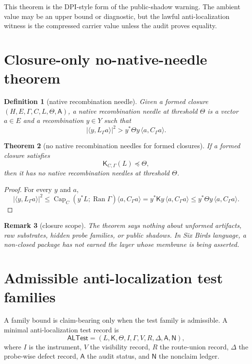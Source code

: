 \documentclass[11pt]{article}
\newtheorem{theorem}{Theorem}[section]
\newtheorem{definition}[theorem]{Definition}
\newtheorem{remark}[theorem]{Remark}
\newcommand{\Capa}{\operatorname{Cap}}
\newcommand{\Ran}{\operatorname{Ran}}
\newcommand{\Kmat}{\mathsf K}
\begin{document}
This theorem is the DPI-style form of the public-shadow warning.  The ambient value may be an upper bound or diagnostic, but the lawful anti-localization witness is the compressed carrier value unless the audit proves equality.

\section{Closure-only no-native-needle theorem}

\begin{definition}[native recombination needle]
Given a formed closure $(H,E,\Gamma,C,L,\Theta,\mathsf A)$, a native recombination needle at threshold $\Theta$ is a vector $a\in E$ and a recombination $y\in Y$ such that
\[
|\langle y,L_\Gamma a\rangle|^2> y^*\Theta y\,\langle a,C_\Gamma a\rangle.
\]
\end{definition}

\begin{theorem}[no native recombination needles for formed closures]
If a formed closure satisfies
\[
\Kmat_{C,\Gamma}(L)\preceq\Theta,
\]
then it has no native recombination needles at threshold $\Theta$.
\end{theorem}

\begin{proof}
For every $y$ and $a$,
\[
|\langle y,L_\Gamma a\rangle|^2
\le \Capa_C(y^*L;\Ran\Gamma)\langle a,C_\Gamma a\rangle
=y^*\Kmat y\,\langle a,C_\Gamma a\rangle
\le y^*\Theta y\,\langle a,C_\Gamma a\rangle.
\]
\end{proof}

\begin{remark}[closure scope]
The theorem says nothing about unformed artifacts, raw substrates, hidden probe families, or public shadows.  In Six Birds language, a non-closed package has not earned the layer whose membrane is being asserted.
\end{remark}

\section{Admissible anti-localization test families}

A family bound is claim-bearing only when the test family is admissible.  A minimal anti-localization test record is
\[
\mathsf{ALTest}=(L,\Kmat,\Theta,I,\Gamma,V,R,\Delta,\mathsf A,\mathsf N),
\]
where $I$ is the instrument, $V$ the visibility record, $R$ the route-union record, $\Delta$ the probe-wise defect record, $\mathsf A$ the audit status, and $\mathsf N$ the nonclaim ledger.
\end{document}
